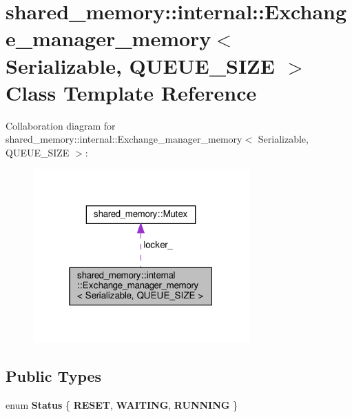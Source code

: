 \hypertarget{classshared__memory_1_1internal_1_1Exchange__manager__memory}{}\section{shared\+\_\+memory\+:\+:internal\+:\+:Exchange\+\_\+manager\+\_\+memory$<$ Serializable, Q\+U\+E\+U\+E\+\_\+\+S\+I\+ZE $>$ Class Template Reference}
\label{classshared__memory_1_1internal_1_1Exchange__manager__memory}


Collaboration diagram for shared\+\_\+memory\+:\+:internal\+:\+:Exchange\+\_\+manager\+\_\+memory$<$ Serializable, Q\+U\+E\+U\+E\+\_\+\+S\+I\+ZE $>$\+:
\nopagebreak
\begin{figure}[H]
\begin{center}
\leavevmode
\includegraphics[width=235pt]{classshared__memory_1_1internal_1_1Exchange__manager__memory__coll__graph}
\end{center}
\end{figure}
\subsection*{Public Types}
\begin{DoxyCompactItemize}
\item 
\mbox{\label{classshared__memory_1_1internal_1_1Exchange__manager__memory_a111ddeef03bfb038bcbc170c28878c08}} 
enum {\bfseries Status} \{ {\bfseries R\+E\+S\+ET}, 
{\bfseries W\+A\+I\+T\+I\+NG}, 
{\bfseries R\+U\+N\+N\+I\+NG}
 \}
\end{DoxyCompactItemize}
